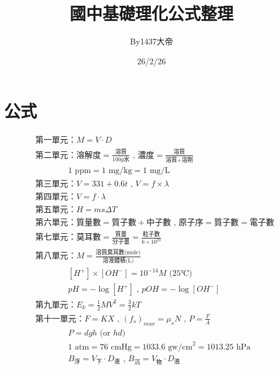 \documentclass{article}
\title{國中基礎理化公式整理}
\author{By1437大帝}
\date{26/2/26}
\begin{document}
\maketitle

\section{公式}
\[\begin{aligned}
&\text{第一單元：} M=V \cdot D \\

&\text{第二單元：} \text{溶解度}=\frac{\text{溶質}}{100g \text{水}} \text{ , } \text{濃度}=\frac{\text{溶質}}{\text{溶質}+\text{溶劑}} \\
&\qquad\qquad 1 \text{ ppm} = 1 \text{ mg/kg} = 1 \text{ mg/L} \\

&\text{第三單元：} V=331+0.6t \text{ , } V=f \times \lambda \\

&\text{第四單元：} V=f \cdot \lambda \\

&\text{第五單元：} H=ms\Delta T \\

&\text{第六單元：} \text{質量數}=\text{質子數}+\text{中子數} \text{ , } \text{原子序}=\text{質子數}=\text{電子數} \\

&\text{第七單元：} \text{莫耳數}=\frac{\text{質量}}{\text{分子量}}=\frac{\text{粒子數}}{6 \times 10^{23}} \\

&\text{第八單元：} M = \frac{\text{溶質莫耳數(mole)}}{\text{溶液體積(L)}} \\
&\qquad\qquad [H^+] \times [OH^-]=10^{-14}M \text{ (25℃)} \\
&\qquad\qquad pH=-\log[H^+] \text{ , } pOH=-\log[OH^-] \\

&\text{第九單元：} E_k=\frac{1}{2}MV^2=\frac{3}{2}kT \\

&\text{第十一單元：} F = KX \text{ , } (f_s)_{max} = \mu_s N \text{ , } P = \frac{F}{A} \\
&\qquad\qquad P=dgh \text{ (or } hd \text{)} \\
&\qquad\qquad 1 \text{ atm} = 76 \text{ cmHg} = 1033.6 \text{ gw/cm}^2 = 1013.25 \text{ hPa} \\
&\qquad\qquad B_{\text{浮}} = V_{\text{下}} \cdot D_{\text{液}} \text{ , } B_{\text{沉}} = V_{\text{物}} \cdot D_{\text{液}} \\


\end{aligned}\]
\end{document}
